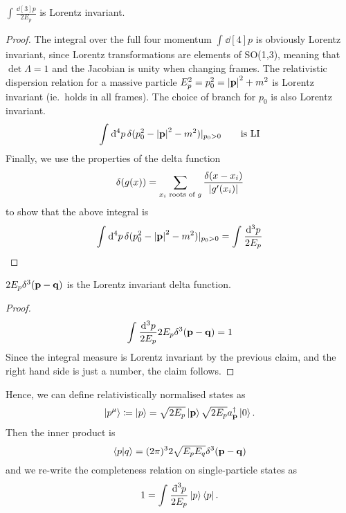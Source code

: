 \begin{claim}
  $\int_{}^{} \frac{\dd[3]{p}}{2 E_p} $ is Lorentz invariant.
\end{claim}
\begin{proof}
  The integral over the full four momentum $\int_{}^{} \dd[4]{p} $ is obviously Lorentz invariant, since Lorentz transformations are elements of SO(1,3), meaning that $\det \Lambda = 1$ and the Jacobian is unity when changing frames.
  The relativistic dispersion relation for a massive particle $E_p^2 = p_0^2 = \abs{\vb{p}}^2 + m^2$ is Lorentz invariant (ie.~holds in all frames). The choice of branch for $p_0$ is also Lorentz invariant.
  \begin{equation}
    \int_{}^{} \dd[4]{p} \delta (p_0^2 - \abs{\vb{p}}^2 - m^2)\rvert_{p_0 >  0} \qquad \text{is LI}
  \end{equation}
  Finally, we use the properties of the delta function
  \begin{equation}
    \delta (g(x)) = \sum_{x_i \text{ roots of } g} \frac{\delta(x - x_i)}{\abs{g'(x_i)}}
  \end{equation}
  to show that the above integral is 
  \begin{equation}
    \int_{}^{} \dd[4]{p} \delta (p_0^2 - \abs{\vb{p}}^2 - m^2)\rvert_{p_0 >  0} = \int_{}^{} \frac{\dd[3]{p}}{2E_p} 
  \end{equation}
\end{proof}

\begin{claim}
  $2E_p \delta^3 (\vb{p}-\vb{q})$ is the Lorentz invariant delta function.
\end{claim}
\begin{proof}
  \begin{equation}
    \int_{}^{} \frac{\dd[3]{p}}{2E_p} 2 E_p \delta^3 (\vb{p}-\vb{q}) = 1
  \end{equation}
  Since the integral measure is Lorentz invariant by the previous claim, and the right hand side is just a number, the claim follows.
\end{proof}

Hence, we can define relativistically normalised states as
\begin{equation}
  \ket{p^\mu} \coloneq \ket{p} = \sqrt{2E_p} \ket{\vb{p}} \sqrt{2 E_p} a_{\vb{p}}^{\dagger} \ket{0}.
\end{equation}
Then the inner product is 
\begin{equation}
  \bra{p}\ket{q} = (2\pi)^3 2 \sqrt{E_p E_q} \delta^3(\vb{p}-\vb{q})
\end{equation}
and we re-write the completeness relation on single-particle states as
\begin{equation}
  1 = \int_{}^{} \frac{\bdd[3]{p}}{2E_p} \ket{p}\bra{p}.
\end{equation}

